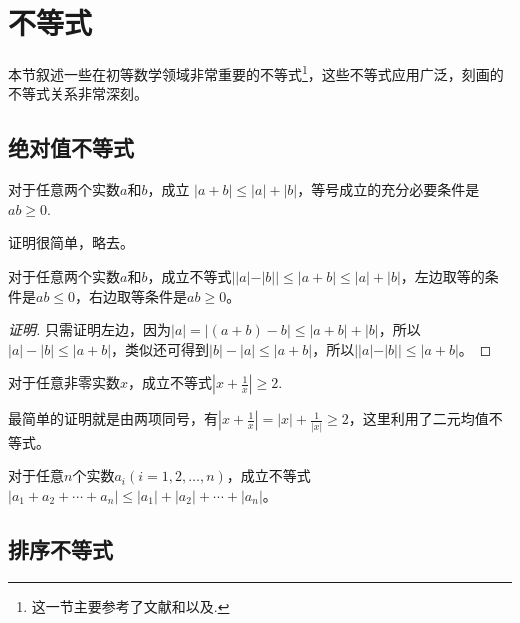
\section{不等式}
\label{sec:some-important-inequation}

本节叙述一些在初等数学领域非常重要的不等式\footnote{这一节主要参考了文献\cite{contest-math-course}和\cite{caculus-course}以及\cite{olympic-math}.}，这些不等式应用广泛，刻画的不等式关系非常深刻。

\subsection{绝对值不等式}
\label{sec:absolute-value-inequality}

\begin{theorem}
  对于任意两个实数$a$和$b$，成立 $|a+b| \leqslant |a| + |b|$，等号成立的充分必要条件是$ab \geqslant 0$.
\end{theorem}

证明很简单，略去。

\begin{inference}
  对于任意两个实数$a$和$b$，成立不等式$||a|-|b|| \leqslant |a+b| \leqslant |a| + |b|$，左边取等的条件是$ab \leqslant 0$，右边取等条件是$ab \geqslant 0$。
\end{inference}

\begin{proof}[证明]
  只需证明左边，因为$|a|=|(a+b)-b| \leqslant |a+b| + |b|$，所以$|a|-|b| \leqslant |a+b|$，类似还可得到$|b|-|a| \leqslant |a+b|$，所以$||a|-|b|| \leqslant |a+b|$。
\end{proof}

\begin{example}
  对于任意非零实数$x$，成立不等式$\left| x+\frac{1}{x} \right| \geqslant 2$.

  最简单的证明就是由两项同号，有$\left| x+\frac{1}{x} \right| = |x|+\frac{1}{|x|} \geqslant 2$，这里利用了二元均值不等式。
\end{example}

\begin{inference}
  对于任意$n$个实数$a_i(i=1,2,\ldots,n)$，成立不等式$|a_1+a_2+\cdots+a_n| \leqslant |a_1| + |a_2| + \cdots + |a_n|$。
\end{inference}

\subsection{排序不等式}

